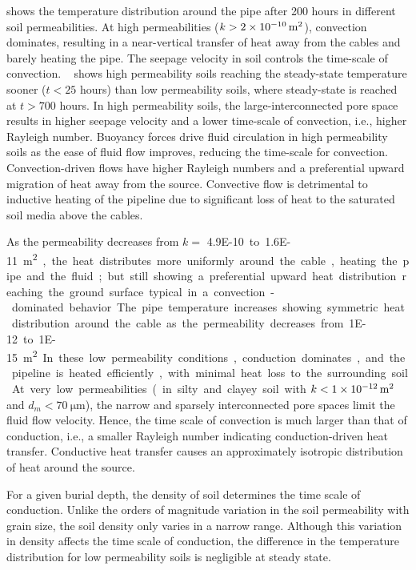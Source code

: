 \documentclass[Journal,letterpaper,InsideFigs]{ascelike-new}
\begin{document}
 shows the temperature distribution around the pipe after 200 hours in different soil permeabilities. At high permeabilities ($k > \SI{2E-10}{\meter\squared}$), convection dominates, resulting in a near-vertical transfer of heat away from the cables and barely heating the pipe. The seepage velocity in soil controls the time-scale of convection. ~ shows high permeability soils reaching the steady-state temperature sooner ($t < 25$ hours) than low permeability soils, where steady-state is reached at $t > 700$ hours. In high permeability soils, the large-interconnected pore space results in higher seepage velocity and a lower time-scale of convection, i.e., higher Rayleigh number. Buoyancy forces drive fluid circulation in high permeability soils as the ease of fluid flow improves, reducing the time-scale for convection. Convection-driven flows have higher Rayleigh numbers and a preferential upward migration of heat away from the source. Convective flow is detrimental to inductive heating of the pipeline due to significant loss of heat to the saturated soil media above the cables.

As the permeability decreases from $k =$ \SI{4.9E-10} to \SI{1.6E-11}{\meter\squared}, the heat distributes more uniformly around the cable, heating the pipe and the fluid; but still showing a preferential upward heat distribution reaching the ground surface typical in a convection-dominated behavior. The pipe temperature increases showing symmetric heat distribution around the cable as the permeability decreases from \SI{1E-12} to \SI{1E-15}{\meter\squared}. In these low permeability conditions, conduction dominates, and the pipeline is heated efficiently, with minimal heat loss to the surrounding soil. At very low permeabilities (in silty and clayey soil with $k < \SI{1E-12}{\meter\squared}$ and $d_m < \SI{70}{\micro\meter}$), the narrow and sparsely interconnected pore spaces limit the fluid flow velocity. Hence, the time scale of convection is much larger than that of conduction, i.e., a smaller Rayleigh number indicating conduction-driven heat transfer. Conductive heat transfer causes an approximately isotropic distribution of heat around the source. 

For a given burial depth, the density of soil determines the time scale of conduction. Unlike the orders of magnitude variation in the soil permeability with grain size, the soil density only varies in a narrow range. Although this variation in density affects the time scale of conduction, the difference in the temperature distribution for low permeability soils is negligible at steady state. 
\end{document}
